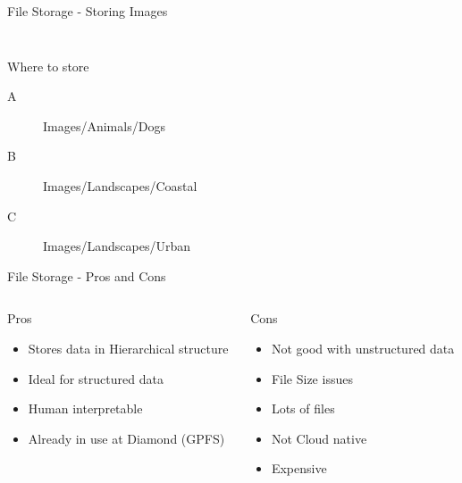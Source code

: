 \begin{frame}{File Storage - Storing Images}
\begin{columns}
\begin{column}{0.47\textwidth}
\begin{figure}
        \label{fig:my_label}
    \end{figure}
    \end{column}
\end{columns} 
\begin{block}{Where to store}
\begin{description}
    \item [A] Images/Animals/Dogs
    \item [B] Images/Landscapes/Coastal
    \item [C] Images/Landscapes/Urban
\end{description}
\end{block}
\end{frame}


\begin{frame}{File Storage - Pros and Cons}
\begin{columns}[t]
    \begin{column}{0.47\textwidth}
    \begin{block}{Pros}
        \begin{itemize}
            \item Stores data in  Hierarchical structure
            \item Ideal for structured data
            \item Human interpretable 
            \item Already in use at Diamond (GPFS)
        \end{itemize}
    \end{block}
    \end{column}
    \begin{column}{0.47\textwidth}
    \begin{block}{Cons}
        \begin{itemize}
            \item Not good with unstructured data
            \item File Size issues
            \item Lots of files
            \item Not Cloud native
            \item Expensive
        \end{itemize}
    \end{block}
    \end{column}
\end{columns}
\end{frame}



